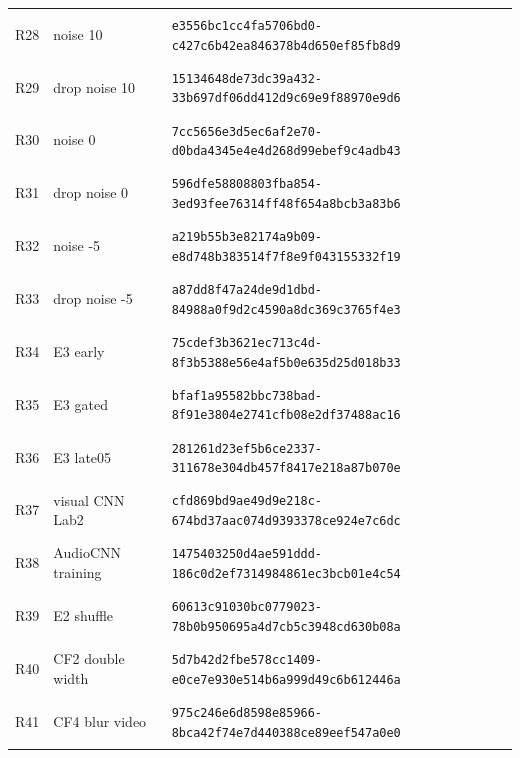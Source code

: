 \begin{longtable}{@{}l>{\raggedright\arraybackslash}p{3.5cm}p{10.8cm}@{}}
\hypertarget{R28}{R28} & noise 10 & {\fontsize{8.8}{11}\selectfont\texttt{e3556bc1cc4fa5706bd0-c427c6b42ea846378b4d650ef85fb8d9}} \\
\hypertarget{R29}{R29} & drop noise 10 & {\fontsize{8.8}{11}\selectfont\texttt{15134648de73dc39a432-33b697df06dd412d9c69e9f88970e9d6}} \\
\hypertarget{R30}{R30} & noise 0 & {\fontsize{8.8}{11}\selectfont\texttt{7cc5656e3d5ec6af2e70-d0bda4345e4e4d268d99ebef9c4adb43}} \\
\hypertarget{R31}{R31} & drop noise 0 & {\fontsize{8.8}{11}\selectfont\texttt{596dfe58808803fba854-3ed93fee76314ff48f654a8bcb3a83b6}} \\
\hypertarget{R32}{R32} & noise -5 & {\fontsize{8.8}{11}\selectfont\texttt{a219b55b3e82174a9b09-e8d748b383514f7f8e9f043155332f19}} \\
\hypertarget{R33}{R33} & drop noise -5 & {\fontsize{8.8}{11}\selectfont\texttt{a87dd8f47a24de9d1dbd-84988a0f9d2c4590a8dc369c3765f4e3}} \\
\hypertarget{R34}{R34} & E3 early & {\fontsize{8.8}{11}\selectfont\texttt{75cdef3b3621ec713c4d-8f3b5388e56e4af5b0e635d25d018b33}} \\
\hypertarget{R35}{R35} & E3 gated & {\fontsize{8.8}{11}\selectfont\texttt{bfaf1a95582bbc738bad-8f91e3804e2741cfb08e2df37488ac16}} \\
\hypertarget{R36}{R36} & E3 late05 & {\fontsize{8.8}{11}\selectfont\texttt{281261d23ef5b6ce2337-311678e304db457f8417e218a87b070e}} \\
\hypertarget{R37}{R37} & visual CNN Lab2 & {\fontsize{8.8}{11}\selectfont\texttt{cfd869bd9ae49d9e218c-674bd37aac074d9393378ce924e7c6dc}} \\
\hypertarget{R38}{R38} & AudioCNN training & {\fontsize{8.8}{11}\selectfont\texttt{1475403250d4ae591ddd-186c0d2ef7314984861ec3bcb01e4c54}} \\
\hypertarget{R39}{R39} & E2 shuffle & {\fontsize{8.8}{11}\selectfont\texttt{60613c91030bc0779023-78b0b950695a4d7cb5c3948cd630b08a}} \\
\hypertarget{R40}{R40} & CF2 double width & {\fontsize{8.8}{11}\selectfont\texttt{5d7b42d2fbe578cc1409-e0ce7e930e514b6a999d49c6b612446a}} \\
\hypertarget{R41}{R41} & CF4 blur video & {\fontsize{8.8}{11}\selectfont\texttt{975c246e6d8598e85966-8bca42f74e7d440388ce89eef547a0e0}} \\
\bottomrule\end{longtable}\endgroup
